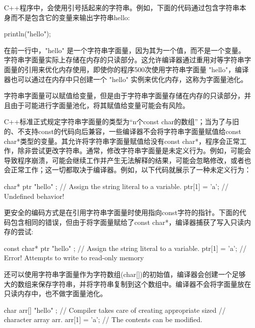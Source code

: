 C++程序中，会使用引号括起来的字符串。例如，下面的代码通过包含字符串本身而不是包含它的变量来输出字符串hello:

\begin{cpp}
println("hello");
\end{cpp}

在前一行中，"hello" 是一个字符串字面量，因为其为一个值，而不是一个变量。字符串字面量实际上存储在内存的只读部分。这允许编译器通过重用对等字符串字面量的引用来优化内存使用，即使你的程序500次使用字符串字面量 "hello"，编译器也可以通过在内存中只创建一个 "hello" 实例来优化内存，这称为字面量池化。

字符串字面量可以赋值给变量，但是由于字符串字面量存储在内存的只读部分，并且由于可能进行字面量池化，将其赋值给变量可能会有风险。

C++标准正式规定字符串字面量的类型为“n个const char的数组”；当为了与旧的、不支持const的代码向后兼容，一些编译器不会将字符串字面量赋值给const char*类型的变量。其允许将字符串字面量赋值给没有const char*，程序会正常工作，除非尝试更改字符串。通常，修改字符串字面量是未定义行为。例如，可能会导致程序崩溃，可能会继续工作并产生无法解释的结果，可能会忽略修改，或者也会正常工作；这一切都取决于编译器。例如，以下代码就展示了一种未定义行为：

\begin{cpp}
char* ptr { "hello" }; // Assign the string literal to a variable.
ptr[1] = 'a'; // Undefined behavior!
\end{cpp}

更安全的编码方式是在引用字符串字面量时使用指向const字符的指针。下面的代码包含相同的错误，但由于将字面量赋给了const char*，编译器捕获了写入只读内存的尝试:

\begin{cpp}
const char* ptr { "hello" }; // Assign the string literal to a variable.
ptr[1] = 'a'; // Error! Attempts to write to read-only memory
\end{cpp}

还可以使用字符串字面量作为字符数组(char[])的初始值，编译器会创建一个足够大的数组来保存字符串，并将字符串复制到这个数组中。编译器不会将字面量放在只读内存中，也不做字面量池化。

\begin{cpp}
char arr[] { "hello" }; // Compiler takes care of creating appropriate sized
                        // character array arr.
arr[1] = 'a'; // The contents can be modified.
\end{cpp}


